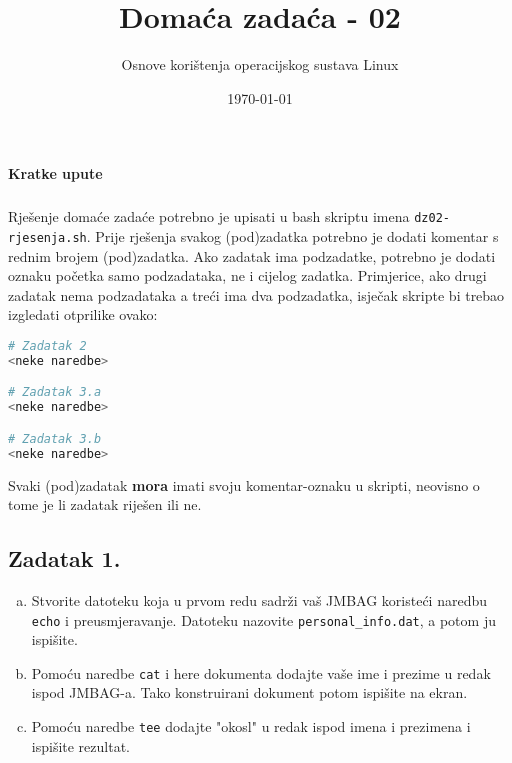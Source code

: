 \documentclass{exam}
\author{Osnove korištenja operacijskog sustava Linux}
\date{\today}
\newcommand{\shell}[1]{\texttt{#1}}
\begin{document}
\title{Domaća zadaća - 02}
\maketitle

\paragraph{Kratke upute}
\subparagraph{}
Rješenje domaće zadaće potrebno je upisati u bash skriptu imena \shell{dz02-rjesenja.sh}. Prije rješenja svakog (pod)zadatka potrebno je dodati komentar s rednim brojem (pod)zadatka. Ako zadatak ima podzadatke, potrebno je dodati oznaku početka samo podzadataka, ne i cijelog zadatka. Primjerice, ako drugi zadatak nema podzadataka a treći ima dva podzadatka, isječak skripte bi trebao izgledati otprilike ovako:
\begin{lstlisting}[language=bash]
# Zadatak 2
<neke naredbe>

# Zadatak 3.a
<neke naredbe>

# Zadatak 3.b
<neke naredbe>
\end{lstlisting}

Svaki (pod)zadatak \textbf{mora} imati svoju komentar-oznaku u skripti, neovisno o tome je li zadatak riješen ili ne.



\subsection*{Zadatak 1.}
  \begin{enumerate}[(a)]
    \item Stvorite datoteku koja u prvom redu sadrži vaš JMBAG koristeći naredbu
      \texttt{echo} i preusmjeravanje. Datoteku nazovite
      \texttt{personal\_info.dat}, a potom ju ispišite.
    \item Pomoću naredbe \texttt{cat} i here dokumenta dodajte vaše ime i
      prezime u redak ispod JMBAG-a. Tako konstruirani dokument potom ispišite
      na ekran.
    \item Pomoću naredbe \shell{tee} dodajte "okosl" u redak ispod imena i
      prezimena i ispišite rezultat.
\end{enumerate}
\end{document}

